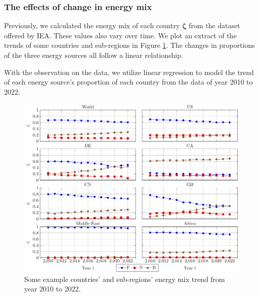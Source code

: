 \documentclass[12pt]{article}
\begin{document}
\subsubsection{The effects of change in energy mix}

Previously, we calculated the energy mix of each country $\boldsymbol{\zeta}$ from the dataset offered by IEA. These values also vary over time. We plot an extract of the trends of some countries and sub-regions in Figure \ref{fig_mix_data}. The changes in proportions of the three energy sources all follow a linear relationship.

With the observation on the data, we utilize linear regression to model the trend of each energy source's proportion of each country from the data of year 2010 to 2022.

\begin{figure}[!t]
	\centering
	\caption{Some example countries' and sub-regions' energy mix trend from year 2010 to 2022.}
	\label{fig_mix_data}
	\includegraphics{figures/mix/mix.pdf}
\end{figure}



\end{document}
